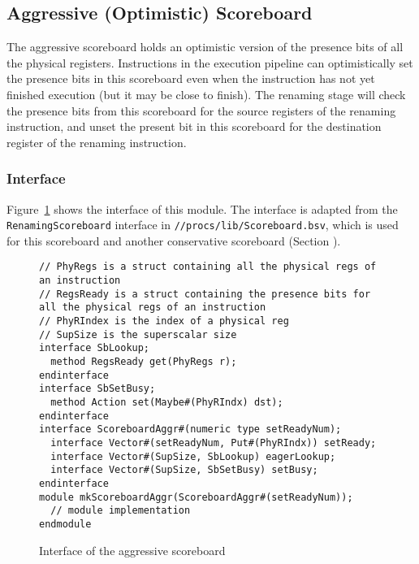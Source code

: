 \subsection{Aggressive (Optimistic) Scoreboard}

The aggressive scoreboard holds an optimistic version of the presence bits of all the physical registers.
Instructions in the execution pipeline can optimistically set the presence bits in this scoreboard even when the instruction has not yet finished execution (but it may be close to finish).
The renaming stage will check the presence bits from this scoreboard for the source registers of the renaming instruction, and unset the present bit in this scoreboard for the destination register of the renaming instruction.

\subsubsection{Interface}
Figure~\ref{fig:aggr-sb-ifc} shows the interface of this module.
The interface is adapted from the \texttt{RenamingScoreboard} interface in \texttt{//procs/lib/Scoreboard.bsv}, which is used for this scoreboard and another conservative scoreboard (Section ).

\begin{figure}[!htb]
\begin{lstlisting}[caption={}]
// PhyRegs is a struct containing all the physical regs of an instruction
// RegsReady is a struct containing the presence bits for all the physical regs of an instruction
// PhyRIndex is the index of a physical reg
// SupSize is the superscalar size
interface SbLookup;
  method RegsReady get(PhyRegs r);
endinterface
interface SbSetBusy;
  method Action set(Maybe#(PhyRIndx) dst);
endinterface
interface ScoreboardAggr#(numeric type setReadyNum);
  interface Vector#(setReadyNum, Put#(PhyRIndx)) setReady;
  interface Vector#(SupSize, SbLookup) eagerLookup;
  interface Vector#(SupSize, SbSetBusy) setBusy;
endinterface
module mkScoreboardAggr(ScoreboardAggr#(setReadyNum));
  // module implementation
endmodule
\end{lstlisting}
\caption{Interface of the aggressive scoreboard}\label{fig:aggr-sb-ifc}
\end{figure}

